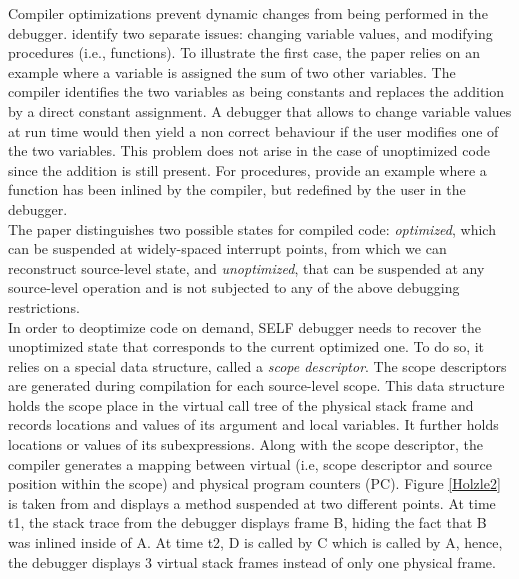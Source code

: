 Compiler optimizations prevent dynamic changes from being performed in the debugger.
 identify two separate issues: changing variable values, and modifying procedures (i.e., functions).
To illustrate the first case, the paper\cite{holzle1992debugging} relies on an example where a variable is assigned the sum of two other variables.
The compiler identifies the two variables as being constants and replaces the addition by a direct constant assignment.
A debugger that allows to change variable values at run time would then yield a non correct behaviour if the user modifies one of the two variables. 
This problem does not arise in the case of unoptimized code since the addition is still present. 
For procedures,  provide an example where a function has been inlined by the compiler, but redefined by the user in the debugger.\\

The paper\cite{holzle1992debugging} distinguishes two possible states for compiled code: \textit{optimized}, which can be suspended at widely-spaced interrupt points, from which we can reconstruct source-level state, and \textit{unoptimized}, that can be suspended at any source-level operation and is not subjected to any of the above debugging restrictions.\\

In order to deoptimize code on demand, SELF debugger needs to recover the unoptimized state that corresponds to the current optimized one. 
To do so, it relies on a special data structure, called a \textit{scope descriptor}. 
The scope descriptors are generated during compilation for each source-level scope. 
This data structure holds the scope place in the virtual call tree of the physical stack frame and records locations and values of its argument and local variables. 
It further holds locations or values of its subexpressions.
Along with the scope descriptor, the compiler generates a mapping between virtual (i.e, scope descriptor and source position within the scope) and physical program counters (PC).
Figure \ref{Holzle2} is taken from\cite{holzle1992debugging} and displays a method suspended at two different points. 
At time t1, the stack trace from the debugger displays frame B, hiding the fact that B was inlined inside of A.
At time t2, D is called by C which is called by A, hence, the debugger displays 3 virtual stack frames instead of only one physical frame.\\

